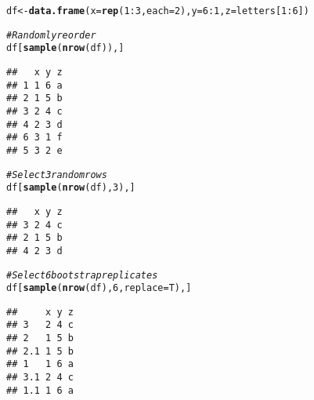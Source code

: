 \documentclass{article}\usepackage[]{graphicx}\usepackage[]{color}
\makeatletter
\newcommand{\hlnum}[1]{\textcolor[rgb]{0.686,0.059,0.569}{#1}}%
\newcommand{\hlcom}[1]{\textcolor[rgb]{0.678,0.584,0.686}{\textit{#1}}}%
\newcommand{\hlopt}[1]{\textcolor[rgb]{0,0,0}{#1}}%
\newcommand{\hlstd}[1]{\textcolor[rgb]{0.345,0.345,0.345}{#1}}%
\newcommand{\hlkwb}[1]{\textcolor[rgb]{0.69,0.353,0.396}{#1}}%
\newcommand{\hlkwc}[1]{\textcolor[rgb]{0.333,0.667,0.333}{#1}}%
\newcommand{\hlkwd}[1]{\textcolor[rgb]{0.737,0.353,0.396}{\textbf{#1}}}%
\newenvironment{kframe}{%
 \def\at@end@of@kframe{}%
 \ifinner\ifhmode%
  \def\at@end@of@kframe{\end{minipage}}%
  \begin{minipage}{\columnwidth}%
 \fi\fi%
 \def\FrameCommand##1{\hskip\@totalleftmargin \hskip-\fboxsep
 \colorbox{shadecolor}{##1}\hskip-\fboxsep
     \hskip-\linewidth \hskip-\@totalleftmargin \hskip\columnwidth}%
 \MakeFramed {\advance\hsize-\width
   \@totalleftmargin\z@ \linewidth\hsize
   \@setminipage}}%
 {\par\unskip\endMakeFramed%
 \at@end@of@kframe}
\newenvironment{knitrout}{}{} %
\makeatother
\begin{document}
\begin{knitrout}
\color{fgcolor}\begin{kframe}
\begin{alltt}
\hlstd{df} \hlkwb{<-} \hlkwd{data.frame}\hlstd{(}\hlkwc{x} \hlstd{=} \hlkwd{rep}\hlstd{(}\hlnum{1}\hlopt{:}\hlnum{3}\hlstd{,} \hlkwc{each} \hlstd{=} \hlnum{2}\hlstd{),} \hlkwc{y} \hlstd{=} \hlnum{6}\hlopt{:}\hlnum{1}\hlstd{,} \hlkwc{z} \hlstd{= letters[}\hlnum{1}\hlopt{:}\hlnum{6}\hlstd{])}

\hlcom{# Randomly reorder}
\hlstd{df[}\hlkwd{sample}\hlstd{(}\hlkwd{nrow}\hlstd{(df)), ]}
\end{alltt}
\begin{verbatim}
##   x y z
## 1 1 6 a
## 2 1 5 b
## 3 2 4 c
## 4 2 3 d
## 6 3 1 f
## 5 3 2 e
\end{verbatim}
\begin{alltt}
\hlcom{# Select 3 random rows}
\hlstd{df[}\hlkwd{sample}\hlstd{(}\hlkwd{nrow}\hlstd{(df),} \hlnum{3}\hlstd{), ]}
\end{alltt}
\begin{verbatim}
##   x y z
## 3 2 4 c
## 2 1 5 b
## 4 2 3 d
\end{verbatim}
\begin{alltt}
\hlcom{# Select 6 bootstrap replicates}
\hlstd{df[}\hlkwd{sample}\hlstd{(}\hlkwd{nrow}\hlstd{(df),} \hlnum{6}\hlstd{,} \hlkwc{replace}\hlstd{=T), ]}
\end{alltt}
\begin{verbatim}
##     x y z
## 3   2 4 c
## 2   1 5 b
## 2.1 1 5 b
## 1   1 6 a
## 3.1 2 4 c
## 1.1 1 6 a
\end{verbatim}
\end{kframe}
\end{knitrout}
\end{document}
